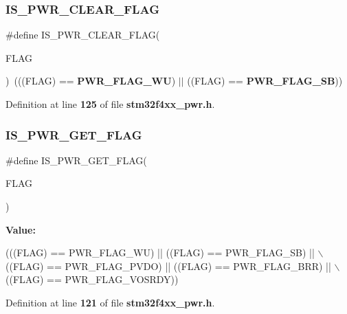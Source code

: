 \subsubsection{I\+S\+\_\+\+P\+W\+R\+\_\+\+C\+L\+E\+A\+R\+\_\+\+F\+L\+AG}
{\footnotesize\ttfamily \#define I\+S\+\_\+\+P\+W\+R\+\_\+\+C\+L\+E\+A\+R\+\_\+\+F\+L\+AG(\begin{DoxyParamCaption}\item[{}]{F\+L\+AG }\end{DoxyParamCaption})~(((F\+L\+AG) == \textbf{ P\+W\+R\+\_\+\+F\+L\+A\+G\+\_\+\+WU}) $\vert$$\vert$ ((F\+L\+AG) == \textbf{ P\+W\+R\+\_\+\+F\+L\+A\+G\+\_\+\+SB}))}



Definition at line \textbf{ 125} of file \textbf{ stm32f4xx\+\_\+pwr.\+h}.

\mbox{\label{group__PWR__Flag_gadc822638d0dd52d2f920808dd96c00a1}} 
\subsubsection{I\+S\+\_\+\+P\+W\+R\+\_\+\+G\+E\+T\+\_\+\+F\+L\+AG}
{\footnotesize\ttfamily \#define I\+S\+\_\+\+P\+W\+R\+\_\+\+G\+E\+T\+\_\+\+F\+L\+AG(\begin{DoxyParamCaption}\item[{}]{F\+L\+AG }\end{DoxyParamCaption})}

{\bfseries Value\+:}
\begin{DoxyCode}
(((FLAG) == PWR_FLAG_WU) || ((FLAG) == PWR_FLAG_SB) || \(\backslash\)
                               ((FLAG) == PWR_FLAG_PVDO) || ((FLAG) == 
      PWR_FLAG_BRR) || \(\backslash\)
                               ((FLAG) == PWR_FLAG_VOSRDY))
\end{DoxyCode}


Definition at line \textbf{ 121} of file \textbf{ stm32f4xx\+\_\+pwr.\+h}.

\mbox{\label{group__PWR__Flag_ga4d4937c0a493bc2ff70e7e66c301c191}} 
